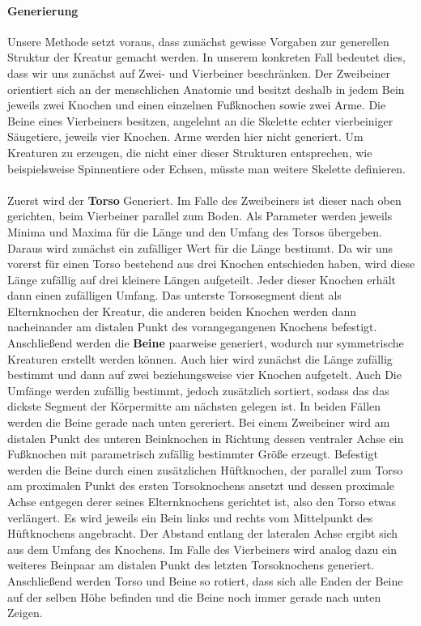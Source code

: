 \paragraph{Generierung}
\label{sec:parametricGeneration}
Unsere Methode setzt voraus, dass zunächst gewisse Vorgaben zur generellen Struktur der Kreatur gemacht werden. In unserem konkreten Fall bedeutet dies, dass wir uns zunächst auf Zwei- und Vierbeiner beschränken. Der Zweibeiner orientiert sich an der menschlichen Anatomie und besitzt deshalb in jedem Bein jeweils zwei Knochen und einen einzelnen Fußknochen sowie zwei Arme. Die Beine eines Vierbeiners besitzen, angelehnt an die Skelette echter vierbeiniger Säugetiere, jeweils vier Knochen. Arme werden hier nicht generiert. Um Kreaturen zu erzeugen, die nicht einer dieser Strukturen entsprechen, wie beispielsweise Spinnentiere oder Echsen, müsste man weitere Skelette definieren.\\
\\
Zuerst  wird der \textbf{Torso} Generiert. Im Falle des Zweibeiners ist dieser nach oben gerichten, beim Vierbeiner parallel zum Boden. Als Parameter werden jeweils Minima und Maxima für die Länge und den Umfang des Torsos übergeben. Daraus wird zunächst ein zufälliger Wert für die Länge bestimmt. Da wir uns vorerst für einen Torso bestehend aus drei Knochen entschieden haben, wird diese Länge zufällig auf drei kleinere Längen aufgeteilt. Jeder dieser Knochen erhält dann einen zufälligen Umfang. Das unterste Torsosegment dient als Elternknochen der Kreatur, die anderen beiden Knochen werden dann nacheinander am distalen Punkt des vorangegangenen Knochens befestigt.\\
Anschließend werden die \textbf{Beine} paarweise generiert, wodurch nur symmetrische Kreaturen erstellt werden können. Auch hier wird zunächst die Länge zufällig bestimmt und dann auf zwei beziehungsweise vier Knochen aufgetelt. Auch Die Umfänge werden zufällig bestimmt, jedoch zusätzlich sortiert, sodass das das dickste Segment der Körpermitte am nächsten gelegen ist. In beiden Fällen werden die Beine gerade nach unten gereriert. Bei einem Zweibeiner wird am distalen Punkt des unteren Beinknochen in Richtung dessen ventraler Achse ein Fußknochen mit parametrisch zufällig bestimmter Größe erzeugt. Befestigt werden die Beine durch einen zusätzlichen Hüftknochen, der parallel zum Torso am proximalen Punkt des ersten Torsoknochens ansetzt und dessen proximale Achse entgegen derer seines Elternknochens gerichtet ist, also den Torso etwas verlängert. Es wird jeweils ein Bein links und rechts vom Mittelpunkt des Hüftknochens angebracht. Der Abstand entlang der lateralen Achse ergibt sich aus dem Umfang des Knochens. Im Falle des Vierbeiners wird analog dazu ein weiteres Beinpaar am distalen Punkt des letzten Torsoknochens generiert. Anschließend werden Torso und Beine so rotiert, dass sich alle Enden der Beine auf der selben Höhe befinden und die Beine noch immer gerade nach unten Zeigen.\\
